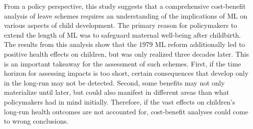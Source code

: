 From a policy perspective, this study suggests that a comprehensive cost-benefit analysis of leave schemes requires an understanding of the implications of ML on various aspects of child development. The primary reason for policymakers to extend the length of ML was to safeguard maternal well-being after childbirth. The results from this analysis show that the 1979 ML reform additionally led to positive health effects on children, but was only realized three decades later. This is an important takeaway for the assessment of such schemes. First, if the time horizon for assessing impacts is too short, certain consequences that develop only in the long-run may not be detected. Second, some benefits may not only materialize until later, but could also manifest in different areas than what policymakers had in mind initially. Therefore, if the vast effects on children's long-run health outcomes are not accounted for, cost-benefit analyses could come to wrong conclusions. %



 

 


